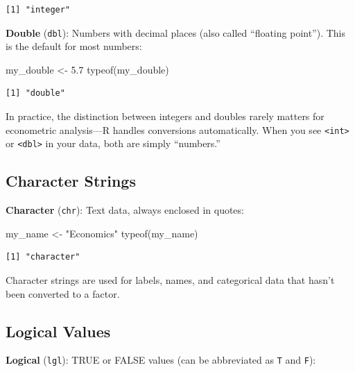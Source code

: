 \documentclass[
  letterpaper,
  DIV=11,
  numbers=noendperiod]{scrreprt}
\newenvironment{Shaded}{\begin{snugshade}}{\end{snugshade}}
\newcommand{\FloatTok}[1]{\textcolor[rgb]{0.68,0.00,0.00}{#1}}
\newcommand{\FunctionTok}[1]{\textcolor[rgb]{0.28,0.35,0.67}{#1}}
\newcommand{\NormalTok}[1]{\textcolor[rgb]{0.00,0.23,0.31}{#1}}
\newcommand{\OtherTok}[1]{\textcolor[rgb]{0.00,0.23,0.31}{#1}}
\newcommand{\StringTok}[1]{\textcolor[rgb]{0.13,0.47,0.30}{#1}}
\begin{document}
\begin{verbatim}
[1] "integer"
\end{verbatim}

\textbf{Double} (\texttt{dbl}): Numbers with decimal places (also called
``floating point''). This is the default for most numbers:

\begin{Shaded}
\begin{Highlighting}[]
\NormalTok{my\_double }\OtherTok{\textless{}{-}} \FloatTok{5.7}
\FunctionTok{typeof}\NormalTok{(my\_double)}
\end{Highlighting}
\end{Shaded}

\begin{verbatim}
[1] "double"
\end{verbatim}

In practice, the distinction between integers and doubles rarely matters
for econometric analysis---R handles conversions automatically. When you
see \texttt{\textless{}int\textgreater{}} or
\texttt{\textless{}dbl\textgreater{}} in your data, both are simply
``numbers.''

\subsection{Character Strings}\label{character-strings}

\textbf{Character} (\texttt{chr}): Text data, always enclosed in quotes:

\begin{Shaded}
\begin{Highlighting}[]
\NormalTok{my\_name }\OtherTok{\textless{}{-}} \StringTok{"Economics"}
\FunctionTok{typeof}\NormalTok{(my\_name)}
\end{Highlighting}
\end{Shaded}

\begin{verbatim}
[1] "character"
\end{verbatim}

Character strings are used for labels, names, and categorical data that
hasn't been converted to a factor.

\subsection{Logical Values}\label{logical-values}

\textbf{Logical} (\texttt{lgl}): TRUE or FALSE values (can be
abbreviated as \texttt{T} and \texttt{F}):
\end{document}
